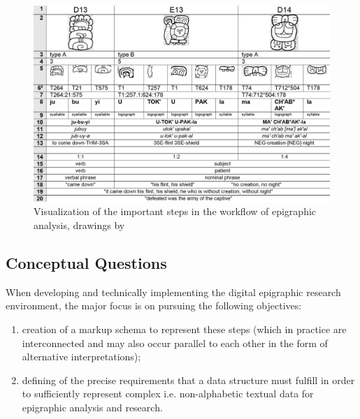\documentclass[amsthm,ebook]{saparticle}
\begin{document}
\begin{figure}[!bp]
\centering
 \includegraphics[width=\columnwidth]{EAGLE2016submission8revisedx-img001.png}
\caption{Visualization of the important steps in the workflow of epigraphic analysis, drawings by \citet{Prager2015}}
\label{fig:1}
\end{figure}





\subsection[Conceptual Questions]{Conceptual Questions}
When developing and technically implementing the digital epigraphic research environment, the major focus is on pursuing
the following objectives: 
\begin{enumerate}
\item creation of a markup schema to represent these steps (which in practice are interconnected
and may also occur parallel to each other in the form of alternative interpretations); 
\item defining of the precise requirements that a data structure must fulfill in order to sufficiently represent complex
i.e. non-alphabetic textual data for epigraphic analysis and research. 
\end{enumerate}
\end{document}
